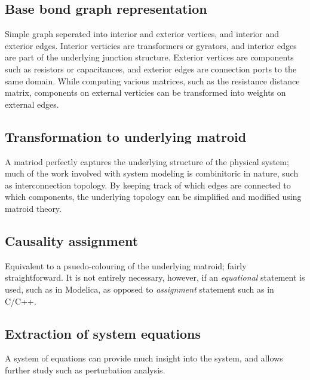 \documentclass[utf,a4paper,12pt]{report}
\begin{document}
\subsection{Base bond graph representation}
Simple graph seperated into interior and exterior vertices, and interior and exterior edges. Interior verticies are transformers or gyrators, and interior edges are part of the underlying junction structure. Exterior vertices are components such as resistors or capacitances, and exterior edges are connection ports to the same domain. While computing various matrices, such as the resistance distance matrix, components on external verticies can be transformed into weights on external edges.
\subsection{Transformation to underlying matroid}
A matriod perfectly captures the underlying structure of the physical system; much of the work involved with system modeling is combinitoric in nature, such as interconnection topology. By keeping track of which edges are connected to which components, the underlying topology can be simplified and modified using matroid theory.
\subsection{Causality assignment}
Equivalent to a psuedo-colouring of the underlying matroid; fairly straightforward. It is not entirely necessary, however, if an \emph{equational} statement is used, such as in Modelica, as opposed to \emph{assignment} statement such as in C/C++.
\subsection{Extraction of system equations}
A system of equations can provide much insight into the system, and allows further study such as perturbation analysis.
\end{document}
